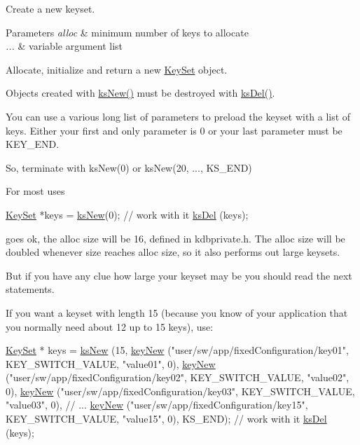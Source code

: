 Create a new keyset. 


\begin{DoxyParams}{Parameters}
{\em alloc} & minimum number of keys to allocate \\
\hline
{\em ...} & variable argument list\\
\hline
\end{DoxyParams}
Allocate, initialize and return a new \hyperlink{classkdb_1_1KeySet}{Key\-Set} object.

Objects created with \hyperlink{group__keyset_ga671e1aaee3ae9dc13b4834a4ddbd2c3c}{ks\-New()} must be destroyed with \hyperlink{group__keyset_ga27e5c16473b02a422238c8d970db7ac8}{ks\-Del()}.

You can use a various long list of parameters to preload the keyset with a list of keys. Either your first and only parameter is 0 or your last parameter must be K\-E\-Y\-\_\-\-E\-N\-D.

So, terminate with ks\-New(0) or ks\-New(20, ..., K\-S\-\_\-\-E\-N\-D)

For most uses 
\begin{DoxyCode}
\hyperlink{classkdb_1_1KeySet_a4eac9850fa4f06c07a5306befc3e4377}{KeySet} *keys = \hyperlink{group__keyset_ga671e1aaee3ae9dc13b4834a4ddbd2c3c}{ksNew}(0);
\textcolor{comment}{// work with it}
\hyperlink{group__keyset_ga27e5c16473b02a422238c8d970db7ac8}{ksDel} (keys);
\end{DoxyCode}
 goes ok, the alloc size will be 16, defined in kdbprivate.\-h. The alloc size will be doubled whenever size reaches alloc size, so it also performs out large keysets.

But if you have any clue how large your keyset may be you should read the next statements.

If you want a keyset with length 15 (because you know of your application that you normally need about 12 up to 15 keys), use\-: 
\begin{DoxyCode}
\hyperlink{classkdb_1_1KeySet_a4eac9850fa4f06c07a5306befc3e4377}{KeySet} * keys = \hyperlink{group__keyset_ga671e1aaee3ae9dc13b4834a4ddbd2c3c}{ksNew} (15,
        \hyperlink{group__key_gad23c65b44bf48d773759e1f9a4d43b89}{keyNew} (\textcolor{stringliteral}{"user/sw/app/fixedConfiguration/key01"}, KEY\_SWITCH\_VALUE,
       \textcolor{stringliteral}{"value01"}, 0),
        \hyperlink{group__key_gad23c65b44bf48d773759e1f9a4d43b89}{keyNew} (\textcolor{stringliteral}{"user/sw/app/fixedConfiguration/key02"}, KEY\_SWITCH\_VALUE,
       \textcolor{stringliteral}{"value02"}, 0),
        \hyperlink{group__key_gad23c65b44bf48d773759e1f9a4d43b89}{keyNew} (\textcolor{stringliteral}{"user/sw/app/fixedConfiguration/key03"}, KEY\_SWITCH\_VALUE,
       \textcolor{stringliteral}{"value03"}, 0),
        \textcolor{comment}{// ...}
        \hyperlink{group__key_gad23c65b44bf48d773759e1f9a4d43b89}{keyNew} (\textcolor{stringliteral}{"user/sw/app/fixedConfiguration/key15"}, KEY\_SWITCH\_VALUE,
       \textcolor{stringliteral}{"value15"}, 0),
        KS\_END);
\textcolor{comment}{// work with it}
\hyperlink{group__keyset_ga27e5c16473b02a422238c8d970db7ac8}{ksDel} (keys);
\end{DoxyCode}


